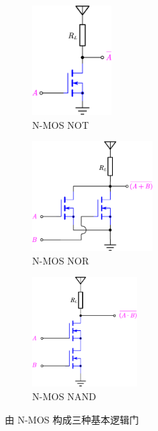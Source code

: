 \documentclass[UTF8]{report}
\theoremstyle{MyLineTheoremStyle} %
\theoremstyle{MyBlockTheoremStyle} %
\theoremstyle{MySubsubsectionStyle} %
\begin{document}
\begin{figure}[H]\centering
\begin{subfigure}[t]{0.33\columnwidth}\centering
    \includegraphics[height=120pt]{assets/2/NMOS NOT.pdf}
    \caption{ N-MOS NOT }
\end{subfigure}\hfill
\begin{subfigure}[t]{0.33\columnwidth}\centering
    \includegraphics[height=120pt]{assets/2/NMOS NOR.pdf}
    \caption{ N-MOS NOR }
\end{subfigure}
\begin{subfigure}[t]{0.33\columnwidth}\centering
    \includegraphics[height=120pt]{assets/2/NMOS NAND.pdf}
    \caption{ N-MOS NAND }
\end{subfigure}
\caption{ 由 N-MOS 构成三种基本逻辑门 }\label{由 N-MOS 构成三种基本逻辑门}
\end{figure}
\end{document}
